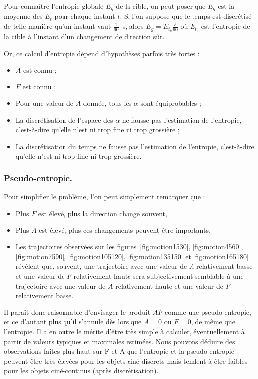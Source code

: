 	Pour connaître l'entropie globale $E_{g}$ de la cible, on peut poser que $E_{g}$ est la moyenne des $E_{t}$ pour chaque instant $t$. Si l'on suppose que le temps est discrétisé de telle manière qu'un instant vaut $\frac{1}{60}$~s, alors $E_{g} = E_{t_{c}} \frac{F}{60}$ où $E_{t_{c}}$ est l'entropie de la cible à l'instant d'un changement de direction sûr.
	
	Or, ce calcul d'entropie dépend d'hypothèses parfois très fortes :
	
	\begin{itemize}
		\item $A$ est connu ;
		\item $F$ est connu ;
		\item Pour une valeur de $A$ donnée, tous les $\alpha$ sont équiprobables ;
		\item La discrétisation de l'espace des $\alpha$ ne fausse pas l'estimation de l'entropie, c'est-à-dire qu'elle n'est ni trop fine ni trop grossière ;
		\item La discrétisation du temps ne fausse pas l'estimation de l'entropie, c'est-à-dire qu'elle n'est ni trop fine ni trop grossière.
	\end{itemize}
	
	\subsubsection{Pseudo-entropie.}	
	Pour simplifier le problème, l'on peut simplement remarquer que :
	\begin{itemize}
		\item Plus $F$ est élevé, plus la direction change souvent,
		\item Plus $A$ est élevé, plus ces changements peuvent être importants,
		\item Les trajectoires observées sur les figures~\ref{fig:motion1530}, \ref{fig:motion4560}, \ref{fig:motion7590}, \ref{fig:motion105120}, \ref{fig:motion135150} et \ref{fig:motion165180} révèlent que, souvent, une trajectoire avec une valeur de $A$ relativement basse et une valeur de $F$ relativement haute sera subjectivement semblable à une trajectoire avec une valeur de $A$ relativement haute et une valeur de $F$ relativement basse.
	\end{itemize}
	
	Il paraît donc raisonnable d'envisager le produit $AF$ comme une pseudo-entropie, et ce d'autant plus qu'il s'annule dès lors que $A=0$ ou $F=0$, de même que l'entropie. Il a en outre le mérite d'être très simple à calculer, éventuellement à partir de valeurs typiques et maximales estimées. Nous pouvons déduire des observations faites plus haut sur F et A que l'entropie et la pseudo-entropie peuvent être très élevées pour les objets ciné-discrets mais tendent à être faibles pour les objets ciné-continus (après discrétisation).
	
